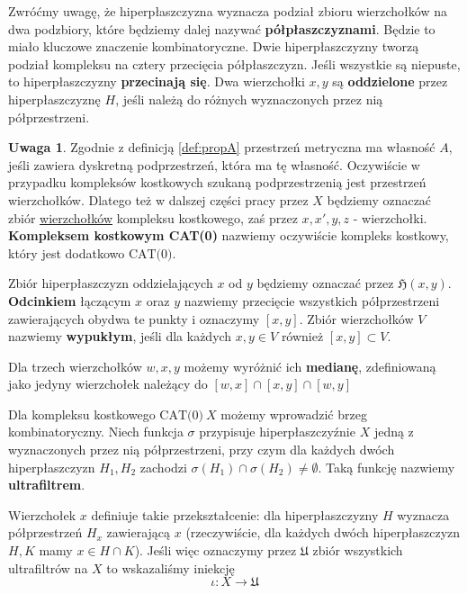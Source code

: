 \documentclass[licencjacka]{pracamgr}
\theoremstyle{definition}
\theoremstyle{definition}
\newtheorem{remark}{Uwaga}[section]
\theoremstyle{definition}
\theoremstyle{definition}
\theoremstyle{definition}
\theoremstyle{plain}
\theoremstyle{plain}
\begin{document}
Zwróćmy uwagę, że hiperpłaszczyzna wyznacza podział zbioru wierzchołków na dwa 
podzbiory, które będziemy dalej nazywać \textbf{półpłaszczyznami}. 
Będzie to miało kluczowe znaczenie kombinatoryczne. 
Dwie hiperpłaszczyzny tworzą podział kompleksu na cztery przecięcia półpłaszczyzn. Jeśli 
wszystkie są niepuste, to hiperpłaszczyzny \textbf{przecinają się}. Dwa wierzchołki 
$ x,y $ są \textbf{oddzielone} przez hiperpłaszczyznę $ H $, jeśli należą do różnych 
wyznaczonych przez nią półprzestrzeni. 

\begin{remark}
	Zgodnie z definicją \ref{def:propA} przestrzeń metryczna ma własność $ A $, jeśli 
	zawiera dyskretną podprzestrzeń, która ma tę własność. Oczywiście w przypadku kompleksów 
	kostkowych szukaną podprzestrzenią jest przestrzeń wierzchołków. Dlatego też w dalszej 
	części pracy przez $ X $ będziemy oznaczać zbiór \underline{wierzchołków} 
	kompleksu kostkowego, zaś przez $ x, x', y, z $ - wierzchołki. \textbf{Kompleksem 
	kostkowym CAT(0)} nazwiemy oczywiście kompleks kostkowy, który jest dodatkowo 
	$ \text{CAT(0)} $. 
\end{remark}

Zbiór hiperpłaszczyzn oddzielających $ x $ od $ y $ będziemy oznaczać przez 
$\mathfrak{H}(x,y)$. \textbf{Odcinkiem} łączącym $ x $ oraz $ y $ nazwiemy przecięcie 
wszystkich półprzestrzeni zawierających obydwa te punkty i oznaczymy $ [x,y]$. Zbiór 
wierzchołków $ V $ nazwiemy \textbf{wypukłym}, jeśli dla każdych $ x,y \in V $ również 
$ [x,y] \subset V $.

Dla trzech wierzchołków $ w,x,y $ możemy wyróżnić ich \textbf{medianę}, zdefiniowaną 
jako jedyny wierzchołek należący do $ [w,x] \cap [x,y] \cap [w,y] $

Dla kompleksu kostkowego $ \text{CAT(0)}~ X$ możemy wprowadzić brzeg kombinatoryczny. 
Niech funkcja $ \sigma $ przypisuje hiperpłaszczyźnie $ X $ jedną z wyznaczonych przez nią 
półprzestrzeni, przy czym dla każdych dwóch hiperpłaszczyzn $ H_1, H_2 $ zachodzi 
$ \sigma(H_1) \cap \sigma(H_2) \neq \emptyset $. Taką funkcję nazwiemy \textbf{ultrafiltrem}.

Wierzchołek $ x $ definiuje takie przekształcenie: dla hiperpłaszczyzny $ H $ wyznacza 
półprzestrzeń $ H_x $ zawierającą $ x $ (rzeczywiście, dla każdych dwóch hiperpłaszczyzn 
$ H,K $ mamy $ x \in H \cap K $). Jeśli więc oznaczymy przez $\mathfrak{U}$ zbiór wszystkich 
ultrafiltrów na $ X $ to wskazaliśmy iniekcję 
$$ \iota : X \rightarrow \mathfrak{U} $$
\end{document}
